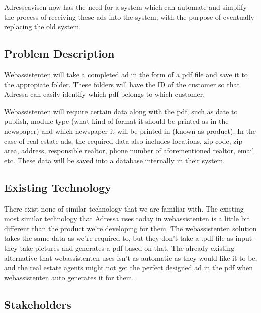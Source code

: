 Adresseavisen now has the need for a system which can automate and simplify the process of receiving these ads into the system, with the purpose of eventually replacing the old system.

\subsection{Problem Description}
Webassistenten will take a completed ad in the form of a pdf file and save it to the appropiate folder. These folders will have the ID of the customer so that Adressa can easily identify which pdf belongs to which customer.

Webassistenten will require certain data along with the pdf, such as date to publish, module type (what kind of format it should be printed as in the newspaper) and which newspaper it will be printed in (known as product). In the case of real estate ads, the required data also includes locations, zip code, zip area, address, responsible realtor, phone number of aforementioned realtor, email etc. These data will be saved into a database internally in their system. 

\subsection{Existing Technology}
There exist none of similar technology that we are familiar with. The existing most similar technology that Adressa uses today in webassistenten is a little bit different than the product we're developing for them. The webassistenten solution takes the same data as we're required to, but they don't take a .pdf file as input - they take pictures and generates a pdf based on that. The already existing alternative that webassistenten uses isn't as automatic as they would like it to be, and the real estate agents might not get the perfect designed ad in the pdf when webassistenten auto generates it for them.

\subsection{Stakeholders}
